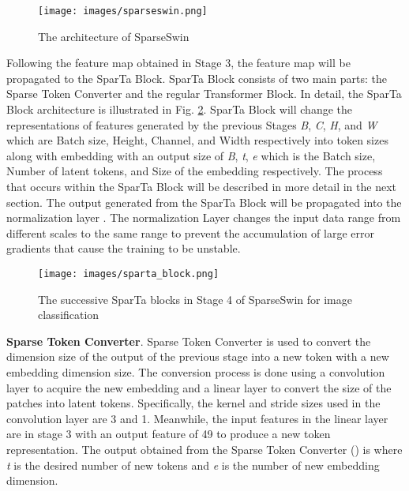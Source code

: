 \documentclass[runningheads]{llncs}
\begin{document}
\begin{figure}[bp]
    \centering
    \texttt{[image: images/sparseswin.png]}
    \caption{The architecture of SparseSwin}
    \label{fig:architecture}
\end{figure}

Following the feature map obtained in Stage 3, the feature map will be propagated to the SparTa Block. SparTa Block consists of two main parts: the Sparse Token Converter and the regular Transformer Block. In detail, the SparTa Block architecture is illustrated in Fig. \ref{fig:sparta_successive_blocks}. SparTa Block will change the representations of features generated by the previous Stages \textit{B}, \textit{C}, \textit{H}, and \textit{W} which are Batch size, Height, Channel, and Width respectively into token sizes along with embedding with an output size of \textit{B}, \textit{t}, \textit{e} which is the Batch size, Number of latent tokens, and Size of the embedding respectively. The process that occurs within the SparTa Block will be described in more detail in the next section. The output generated from the SparTa Block will be propagated into the normalization layer \cite{ba2016layer}. The normalization Layer changes the input data range from different scales to the same range to prevent the accumulation of large error gradients that cause the training to be unstable.

\begin{figure}[htp]
    \centering
    \texttt{[image: images/sparta\_block.png]}
    \caption{The successive SparTa blocks in Stage 4 of SparseSwin for image classification}
    \label{fig:sparta_successive_blocks}
\end{figure}

\textbf{Sparse Token Converter}. Sparse Token Converter is used to convert the dimension size of the output of the previous stage into a new token with a new embedding dimension size. The conversion process is done using a convolution layer \cite{lecun1995convolutional} to acquire the new embedding and a linear layer to convert the size of the patches into latent tokens. Specifically, the kernel and stride sizes used in the convolution layer are 3 and 1. Meanwhile, the input features in the linear layer are  in stage 3 with an output feature of 49 to produce a new token representation. The output obtained from the Sparse Token Converter () is  where \textit{t} is the desired number of new tokens and \textit{e} is the number of new embedding dimension.
\end{document}
